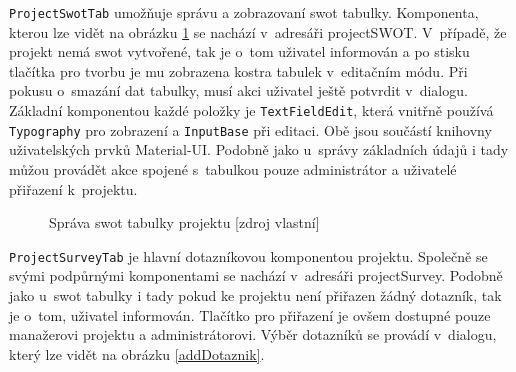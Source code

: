     
\texttt{ProjectSwotTab} umožňuje správu a zobrazovaní swot tabulky. Komponenta, kterou lze vidět na obrázku \ref{swotinfo} se nachází v~adresáři projectSWOT. V~případě, že projekt nemá swot vytvořené, tak je o~tom uživatel informován a po stisku tlačítka pro tvorbu je mu zobrazena kostra tabulek v~editačním módu. Při pokusu o~smazání dat tabulky, musí akci uživatel ještě potvrdit v~dialogu. Základní komponentou každé položky je \texttt{TextFieldEdit}, která vnitřně používá \texttt{Typography} pro zobrazení a \texttt{InputBase} při editaci. Obě jsou součástí knihovny uživatelských prvků Material-UI. Podobně jako u~správy základních údajů i tady můžou provádět akce spojené s~tabulkou pouze administrátor a uživatelé přiřazení k~projektu.

    \begin{figure}[ht]
    \begin{center}
    \caption{Správa swot tabulky projektu [zdroj vlastní]}
    \label{swotinfo}
    \end{center}
    \end{figure}
    
\texttt{ProjectSurveyTab} je hlavní dotazníkovou komponentou projektu. Společně se svými podpůrnými komponentami se nachází v~adresáři projectSurvey. Podobně jako u~swot tabulky i tady pokud ke projektu není přiřazen žádný dotazník, tak je o~tom, uživatel informován. Tlačítko pro přiřazení je ovšem dostupné pouze manažerovi projektu a administrátorovi. Výběr dotazníků se provádí v~dialogu, který lze vidět na obrázku \ref{addDotaznik}.

